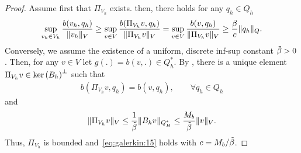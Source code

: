 \begin{proof}
  Assume first that $\Pi_{V_h}$ exists. then, there holds for any
  $q_h\in Q_h$
  \begin{gather}
    \sup_{v_h\in V_h} \frac{b(v_h, q_h)}{\lVert v_h\rVert_V}
    \ge
    \sup_{v\in V} \frac{b(\Pi_{V_h}v, q_h)}{\lVert\Pi_{V_h} v\rVert_V}
    =
    \sup_{v\in V} \frac{b(v, q_h)}{\lVert\Pi_{V_h} v\rVert_V}
    \ge \frac{\beta}{c} \lVert q_h\rVert_Q.
  \end{gather}
  Conversely, we assume the existence of a uniform, discrete inf-sup
  constant $\tilde{\beta}>0$. Then, for any $v\in V$ let
  $g(.) = b(v,.) \in Q_h^*$. By
  , there is a unique
  element $\Pi_{V_h} v \in {\operatorname{ker}\left(B_h\right)}^\perp$ such that
  \begin{gather}
    b(\Pi_{V_h}v,q_h) = b(v, q_h),\qquad\forall q_h\in Q_h
  \end{gather}
  and
  \begin{gather}
    \lVert\Pi_{V_h}v\rVert_V
    \le \frac1{\tilde{\beta}}\lVert B_h v\rVert_{Q_H^*}
    \le \frac{M_b}{\tilde{\beta}} \lVert v\rVert_V.
  \end{gather}
  Thus, $\Pi_{V_h}$ is bounded and~\eqref{eq:galerkin:15} holds with
  $c=M_b/\tilde{\beta}$.
\end{proof}



